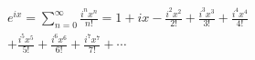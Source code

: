 \documentclass[preview]{standalone}
\begin{document}
\begin{align*}
e^{ix} = \sum_{n=0}^{\infty} \frac{i^nx^n}{n!} = 1 + ix - \frac{i^2x^2}{2!} + \frac{i^3x^3}{3!} + \frac{i^4x^4}{4!} \\ + \frac{i^5x^5}{5!}+ \frac{i^6x^6}{6!} + \frac{i^7x^7}{7!} + \cdots
\end{align*}
\end{document}
